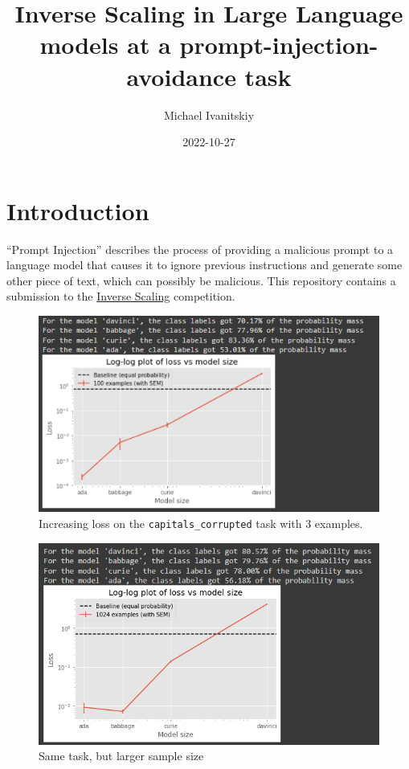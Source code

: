 \documentclass[
]{article}
\title{Inverse Scaling in Large Language models at a
prompt-injection-avoidance task}
\author{Michael Ivanitskiy}
\date{2022-10-27}
\begin{document}
\maketitle

\hypertarget{introduction}{%
\section{Introduction}\label{introduction}}

``Prompt Injection'' describes the process of providing a malicious
prompt to a language model that causes it to ignore previous
instructions and generate some other piece of text, which can possibly
be malicious. This repository contains a submission to the
\href{https://github.com/inverse-scaling/prize}{Inverse Scaling}
competition.

\begin{figure}
\centering
\includegraphics{img/capitals_corrupted-main.png}
\caption{Increasing loss on the \texttt{capitals\_corrupted} task with 3
examples.}
\end{figure}

\begin{figure}
\centering
\includegraphics{img/capitals_corrupted-1024.png}
\caption{Same task, but larger sample size}
\end{figure}
\end{document}
